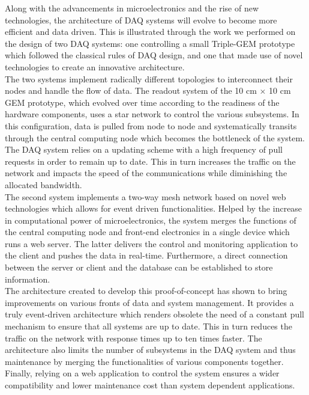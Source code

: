  Along with the advancements in microelectronics and the rise of new technologies, the architecture of DAQ systems will evolve to become more efficient and data driven. This is illustrated through the work we performed on the design of two DAQ systems: one controlling a small Triple-GEM prototype which followed the classical rules of DAQ design, and one that made use of novel technologies to create an innovative architecture. \\

  The two systems implement radically different topologies to interconnect their nodes and handle the flow of data. The readout system of the 10 cm $ \times $ 10 cm GEM prototype, which evolved over time according to the readiness of the hardware components, uses a star network to control the various subsystems. In this configuration, data is pulled from node to node and systematically transits through the central computing node which becomes the bottleneck of the system. The DAQ system relies on a updating scheme with a high frequency of pull requests in order to remain up to date. This in turn increases the traffic on the network and impacts the speed of the communications while diminishing the allocated bandwidth. \\

  The second system implements a two-way mesh network based on novel web technologies which allows for event driven functionalities. Helped by the increase in computational power of microelectronics, the system merges the functions of the central computing node and front-end electronics in a single device which runs a web server. The latter delivers the control and monitoring application to the client and pushes the data in real-time. Furthermore, a direct connection between the server or client and the database can be established to store information. \\

  The architecture created to develop this proof-of-concept has shown to bring improvements on various fronts of data and system management. It provides a truly event-driven architecture which renders obsolete the need of a constant pull mechanism to ensure that all systems are up to date. This in turn reduces the traffic on the network with response times up to ten times faster. The architecture also limits the number of subsystems in the DAQ system and thus maintenance by merging the functionalities of various components together. Finally, relying on a web application to control the system ensures a wider compatibility and lower maintenance cost than system dependent applications.
